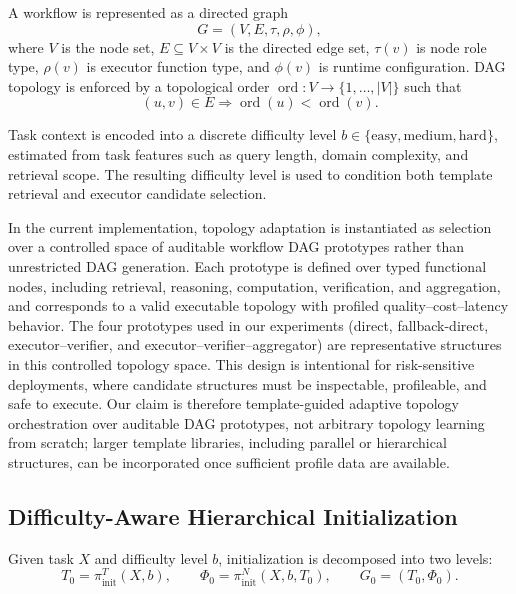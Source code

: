 \documentclass[manuscript,review,anonymous]{acmart}
\begin{document}
A workflow is represented as a directed graph
\begin{equation}
G=(V,E,\tau,\rho,\phi),
\end{equation}
where $V$ is the node set, $E\subseteq V\times V$ is the directed edge set, $\tau(v)$ is node role type, $\rho(v)$ is executor function type, and $\phi(v)$ is runtime configuration. DAG topology is enforced by a topological order $\operatorname{ord}:V\rightarrow\{1,\dots,|V|\}$ such that
\begin{equation}
(u,v)\in E\Rightarrow \operatorname{ord}(u)<\operatorname{ord}(v).
\end{equation}

Task context is encoded into a discrete difficulty level $b \in \{\text{easy}, \text{medium}, \text{hard}\}$, estimated from task features such as query length, domain complexity, and retrieval scope. The resulting difficulty level is used to condition both template retrieval and executor candidate selection.

In the current implementation, topology adaptation is instantiated as selection over a controlled space of auditable workflow DAG prototypes rather than unrestricted DAG generation. Each prototype is defined over typed functional nodes, including retrieval, reasoning, computation, verification, and aggregation, and corresponds to a valid executable topology with profiled quality--cost--latency behavior. The four prototypes used in our experiments (direct, fallback-direct, executor--verifier, and executor--verifier--aggregator) are representative structures in this controlled topology space. This design is intentional for risk-sensitive deployments, where candidate structures must be inspectable, profileable, and safe to execute. Our claim is therefore template-guided adaptive topology orchestration over auditable DAG prototypes, not arbitrary topology learning from scratch; larger template libraries, including parallel or hierarchical structures, can be incorporated once sufficient profile data are available.

\subsection{Difficulty-Aware Hierarchical Initialization}

Given task $X$ and difficulty level $b$, initialization is decomposed into two levels:
\begin{equation}
T_0=\pi_{\text{init}}^{T}(X,b),
\qquad
\Phi_0=\pi_{\text{init}}^{N}(X,b,T_0),
\qquad
G_0=(T_0,\Phi_0).
\end{equation}
\end{document}
